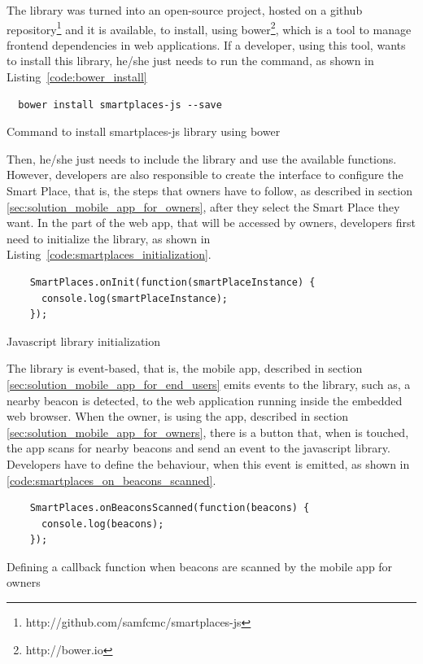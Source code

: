 The library was turned into an open-source project, hosted on a github repository\footnote{http://github.com/samfcmc/smartplaces-js} and it is available, to install, using bower\footnote{http://bower.io}, which is a tool to manage frontend dependencies in web applications.
If a developer, using this tool, wants to install this library, he/she just needs to run the command, as shown in Listing~\ref{code:bower_install}

\begin{listing}[H]
  \begin{verbatim}
  bower install smartplaces-js --save
  \end{verbatim}
  \caption{Command to install smartplaces-js library using bower}
  \label{code:bower_install}
\end{listing}
Then, he/she just needs to include the library and use the available functions.
However, developers are also responsible to create the interface to configure the Smart Place, that is, the steps that owners have to follow, as described in section \ref{sec:solution_mobile_app_for_owners}, after they select the Smart Place they want.
In the part of the web app, that will be accessed by owners, developers first need to initialize the library, as shown in Listing~\ref{code:smartplaces_initialization}.
\begin{listing}[H]
  \begin{verbatim}
    SmartPlaces.onInit(function(smartPlaceInstance) {
      console.log(smartPlaceInstance);
    });
  \end{verbatim}
  \caption{Javascript library initialization}
  \label{code:smartplaces_initialization}
\end{listing}
The library is event-based, that is, the mobile app, described in section \ref{sec:solution_mobile_app_for_end_users} emits events to the library, such as, a nearby beacon is detected, to the web application running inside the embedded web browser.
When the owner, is using the app, described in section \ref{sec:solution_mobile_app_for_owners}, there is a button that, when is touched, the app scans for nearby beacons and send an event to the javascript library.
Developers have to define the behaviour, when this event is emitted, as shown in \ref{code:smartplaces_on_beacons_scanned}.

\begin{listing}[H]
  \begin{verbatim}
    SmartPlaces.onBeaconsScanned(function(beacons) {
      console.log(beacons);
    });
  \end{verbatim}
  \caption{Defining a callback function when beacons are scanned by the mobile app for owners}
  \label{code:smartplaces_on_beacons_scanned}
\end{listing}

